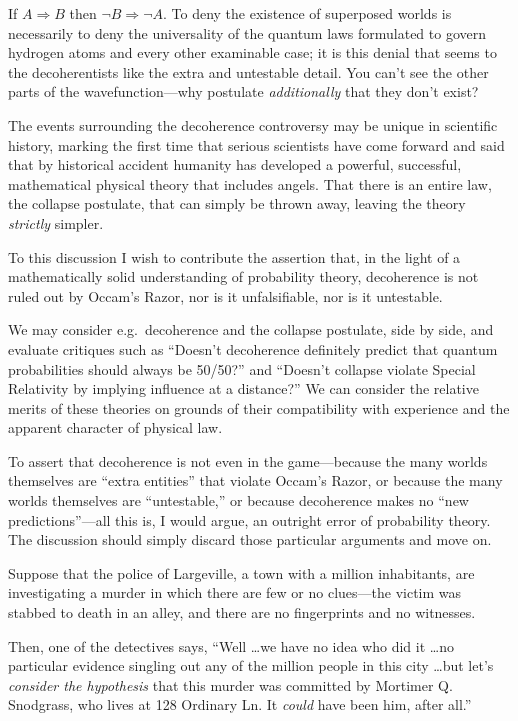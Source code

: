 {
 If $A \Rightarrow B$ then $\lnot B \Rightarrow
 \lnot A$. To deny the existence of superposed worlds is
necessarily to deny the universality of the quantum laws formulated to
govern hydrogen atoms and every other examinable case; it is this
denial that seems to the decoherentists like the extra and untestable
detail. You can't see the other parts of the
wavefunction---why postulate \textit{additionally} that they
don't exist?}

{
 The events surrounding the decoherence controversy may be unique
in scientific history, marking the first time that serious scientists
have come forward and said that by historical accident humanity has
developed a powerful, successful, mathematical physical theory that
includes angels. That there is an entire law, the collapse postulate,
that can simply be thrown away, leaving the theory \textit{strictly}
simpler.}

{
 To this discussion I wish to contribute the assertion that, in the
light of a mathematically solid understanding of probability theory,
decoherence is not ruled out by Occam's Razor, nor is
it unfalsifiable, nor is it untestable.}

{
 We may consider e.g.~decoherence and the collapse postulate, side
by side, and evaluate critiques such as
``Doesn't decoherence definitely
predict that quantum probabilities should always be
50/50?'' and
``Doesn't collapse violate Special
Relativity by implying influence at a distance?'' We
can consider the relative merits of these theories on grounds of their
compatibility with experience and the apparent character of physical
law.}

{
 To assert that decoherence is not even in the game---because the
many worlds themselves are ``extra
entities'' that violate Occam's
Razor, or because the many worlds themselves are
``untestable,'' or because
decoherence makes no ``new
predictions''---all this is, I would argue, an
outright error of probability theory. The discussion should simply
discard those particular arguments and move on.}

\myendsectiontext


{
 Suppose that the police of Largeville, a town with a million
inhabitants, are investigating a murder in which there are few or no
clues---the victim was stabbed to death in an alley, and there are no
fingerprints and no witnesses. }

{
 Then, one of the detectives says, ``Well \ldots we
have no idea who did it \ldots no particular evidence singling out any
of the million people in this city \ldots but let's
\textit{consider the hypothesis} that this murder was committed by
Mortimer Q. Snodgrass, who lives at 128 Ordinary Ln. It \textit{could}
have been him, after all.''}

